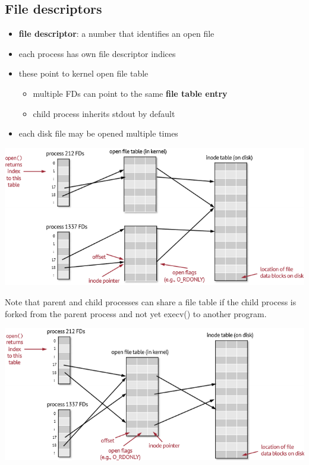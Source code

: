 \documentclass[letterpaper,12pt]{article}
\begin{document}
\subsection{File descriptors}
\begin{itemize}
    \item \textbf{file descriptor}: a number that identifies an open file
    \item each process has own file descriptor indices
    \item these point to kernel open file table\begin{itemize}
        \item multiple FDs can point to the same \textbf{file table entry}
        \item child process inherits stdout by default
    \end{itemize}
    \item each disk file may be opened multiple times
\end{itemize}

\includegraphics*[scale = 0.9]{./Images/File descripter.png}

Note that parent and child processes can share a file table if the child process is forked from the parent process and not yet execv() to another program.

\includegraphics*[scale = 0.9]{./Images/Parent child FDs.png}
 
\end{document}
